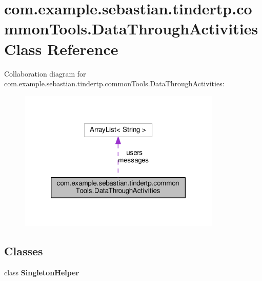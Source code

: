 \hypertarget{classcom_1_1example_1_1sebastian_1_1tindertp_1_1commonTools_1_1DataThroughActivities}{}\section{com.\+example.\+sebastian.\+tindertp.\+common\+Tools.\+Data\+Through\+Activities Class Reference}
\label{classcom_1_1example_1_1sebastian_1_1tindertp_1_1commonTools_1_1DataThroughActivities}


Collaboration diagram for com.\+example.\+sebastian.\+tindertp.\+common\+Tools.\+Data\+Through\+Activities\+:
\nopagebreak
\begin{figure}[H]
\begin{center}
\leavevmode
\includegraphics[width=274pt]{classcom_1_1example_1_1sebastian_1_1tindertp_1_1commonTools_1_1DataThroughActivities__coll__graph}
\end{center}
\end{figure}
\subsection*{Classes}
\begin{DoxyCompactItemize}
\item 
class {\bfseries Singleton\+Helper}
\end{DoxyCompactItemize}
